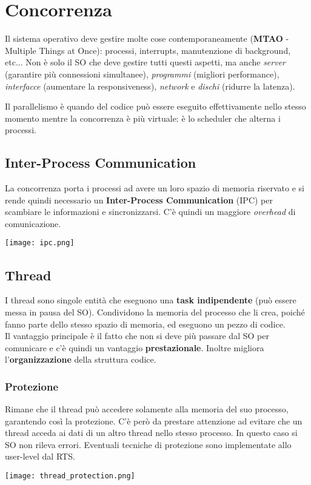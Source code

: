 \newpage
\section{Concorrenza}
Il sistema operativo deve gestire molte cose contemporaneamente (\textbf{MTAO} - Multiple Things at Once): processi, interrupts, manutenzione di background, etc...
Non è solo il SO che deve gestire tutti questi aspetti, ma anche \emph{server} (garantire più connessioni simultanee), \emph{programmi} (migliori performance), \emph{interfacce} (aumentare la responsiveness), \emph{network} e \emph{dischi} (ridurre la latenza).

\begin{note}
	Il parallelismo è quando del codice può essere eseguito effettivamente nello stesso momento mentre la concorrenza è più virtuale: è lo scheduler che alterna i processi.
\end{note}

\subsection{Inter-Process Communication}
La concorrenza porta i processi ad avere un loro spazio di memoria riservato e si rende quindi necessario un \textbf{Inter-Process Communication} (IPC) per scambiare le informazioni e sincronizzarsi. C'è quindi un maggiore \emph{overhead} di comunicazione.
\begin{center}
	\texttt{[image: ipc.png]}
\end{center}


\subsection{Thread}
I thread sono singole entità che eseguono una \textbf{task indipendente} (può essere messa in pausa del SO). Condividono la memoria del processo che li crea, poiché fanno parte dello stesso spazio di memoria, ed eseguono un pezzo di codice. \\
Il vantaggio principale è il fatto che non si deve più passare dal SO per comunicare e c'è quindi un vantaggio \textbf{prestazionale}. Inoltre migliora l'\textbf{organizzazione} della struttura codice.

\subsubsection{Protezione}
Rimane che il thread può accedere solamente alla memoria del suo processo, garantendo così la protezione. C'è però da prestare attenzione ad evitare che un thread acceda ai dati di un altro thread nello stesso processo. In questo caso si SO non rileva errori. Eventuali tecniche di protezione sono implementate allo user-level dal RTS.
\begin{center}
	\texttt{[image: thread\_protection.png]}
\end{center}

